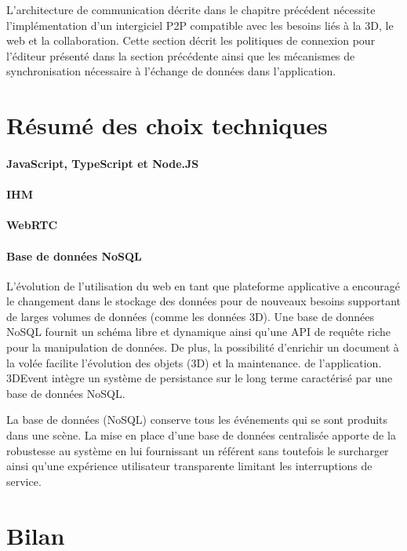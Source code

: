 L'architecture de communication décrite dans le chapitre précédent nécessite 
l'implémentation d'un intergiciel \gls{P2P} compatible avec les besoins liés à la 
\gls{3D}, le 
web et la collaboration. Cette section décrit les politiques de connexion pour 
l'éditeur présenté dans la section précédente ainsi que les mécanismes de 
synchronisation nécessaire à l'échange de données dans l'application. 




\section{Résumé des choix techniques}

\paragraph{JavaScript, TypeScript et Node.JS}
\paragraph{IHM}
\paragraph{WebRTC}
\paragraph{Base de données NoSQL}\label{p:nosql} L'évolution de 
l'utilisation du web en tant que plateforme applicative a encouragé le changement 
dans le stockage des données pour de nouveaux besoins supportant de larges 
volumes de données (comme les données 3D). Une base de données \gls{NoSQL} 
fournit un schéma libre et dynamique ainsi qu'une API de requête riche pour la 
manipulation de données. De plus, la possibilité d'enrichir un document \og à la volée\fg{} 
facilite l'évolution des objets (3D) et la maintenance. de l'application.
3DEvent intègre un système de persistance sur le long terme caractérisé par une 
base de données \gls{NoSQL}.

La base de données (\gls{NoSQL}) conserve tous les événements qui se
sont produits dans une scène. 
La mise en place d'une base de données centralisée apporte de la robustesse au 
système en lui fournissant un référent sans toutefois le surcharger ainsi qu'une 
expérience utilisateur transparente limitant les interruptions de service.
\section{Bilan}



